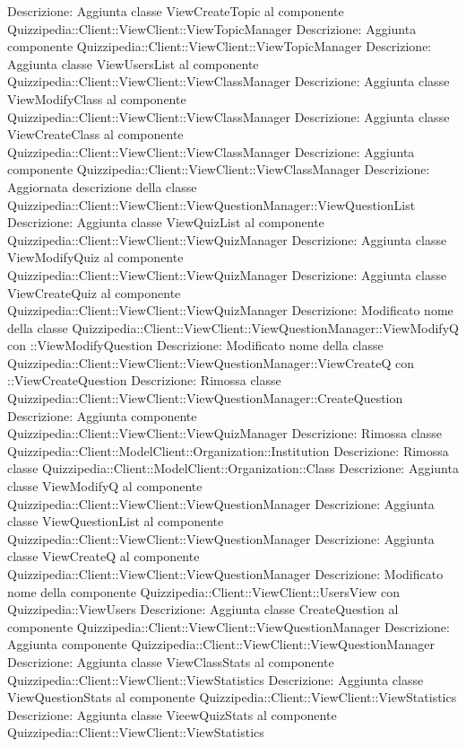 Descrizione: Aggiunta classe ViewCreateTopic al componente Quizzipedia::Client::ViewClient::ViewTopicManager 
Descrizione: Aggiunta componente Quizzipedia::Client::ViewClient::ViewTopicManager 
Descrizione: Aggiunta classe ViewUsersList al componente Quizzipedia::Client::ViewClient::ViewClassManager 
Descrizione: Aggiunta classe ViewModifyClass al componente Quizzipedia::Client::ViewClient::ViewClassManager 
Descrizione: Aggiunta classe ViewCreateClass al componente Quizzipedia::Client::ViewClient::ViewClassManager 
Descrizione: Aggiunta componente Quizzipedia::Client::ViewClient::ViewClassManager 
Descrizione: Aggiornata descrizione della classe Quizzipedia::Client::ViewClient::ViewQuestionManager::ViewQuestionList 
Descrizione: Aggiunta classe ViewQuizList al componente Quizzipedia::Client::ViewClient::ViewQuizManager 
Descrizione: Aggiunta classe ViewModifyQuiz al componente Quizzipedia::Client::ViewClient::ViewQuizManager 
Descrizione: Aggiunta classe ViewCreateQuiz al componente Quizzipedia::Client::ViewClient::ViewQuizManager 
Descrizione: Modificato nome della classe Quizzipedia::Client::ViewClient::ViewQuestionManager::ViewModifyQ con ::ViewModifyQuestion 
Descrizione: Modificato nome della classe Quizzipedia::Client::ViewClient::ViewQuestionManager::ViewCreateQ con ::ViewCreateQuestion 
Descrizione: Rimossa classe Quizzipedia::Client::ViewClient::ViewQuestionManager::CreateQuestion 
Descrizione: Aggiunta componente Quizzipedia::Client::ViewClient::ViewQuizManager 
Descrizione: Rimossa classe Quizzipedia::Client::ModelClient::Organization::Institution 
Descrizione: Rimossa classe Quizzipedia::Client::ModelClient::Organization::Class 
Descrizione: Aggiunta classe ViewModifyQ al componente Quizzipedia::Client::ViewClient::ViewQuestionManager 
Descrizione: Aggiunta classe ViewQuestionList al componente Quizzipedia::Client::ViewClient::ViewQuestionManager 
Descrizione: Aggiunta classe ViewCreateQ al componente Quizzipedia::Client::ViewClient::ViewQuestionManager 
Descrizione: Modificato nome della componente Quizzipedia::Client::ViewClient::UsersView con Quizzipedia::ViewUsers 
Descrizione: Aggiunta classe CreateQuestion al componente Quizzipedia::Client::ViewClient::ViewQuestionManager 
Descrizione: Aggiunta componente Quizzipedia::Client::ViewClient::ViewQuestionManager 
Descrizione: Aggiunta classe ViewClassStats al componente Quizzipedia::Client::ViewClient::ViewStatistics 
Descrizione: Aggiunta classe ViewQuestionStats al componente Quizzipedia::Client::ViewClient::ViewStatistics 
Descrizione: Aggiunta classe VieewQuizStats al componente Quizzipedia::Client::ViewClient::ViewStatistics 
